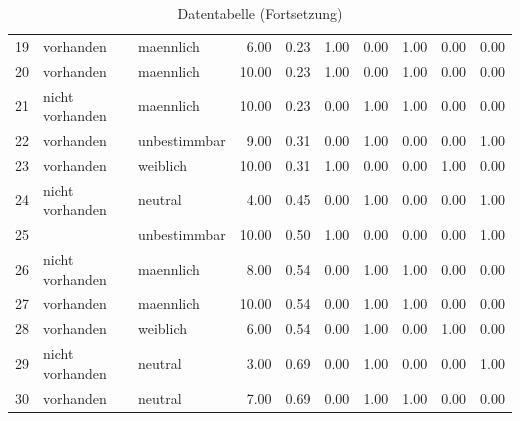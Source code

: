 \begin{table}
\begin{center}
{\begin{tabular}{rllrrrrrrr}
  19 & vorhanden & maennlich & 6.00 & 0.23 & 1.00 & 0.00 & 1.00 & 0.00 & 0.00 \\ 
  20 & vorhanden & maennlich & 10.00 & 0.23 & 1.00 & 0.00 & 1.00 & 0.00 & 0.00 \\ 
  21 & nicht vorhanden & maennlich & 10.00 & 0.23 & 0.00 & 1.00 & 1.00 & 0.00 & 0.00 \\ 
  22 & vorhanden & unbestimmbar & 9.00 & 0.31 & 0.00 & 1.00 & 0.00 & 0.00 & 1.00 \\ 
  23 & vorhanden & weiblich & 10.00 & 0.31 & 1.00 & 0.00 & 0.00 & 1.00 & 0.00 \\ 
  24 & nicht vorhanden & neutral & 4.00 & 0.45 & 0.00 & 1.00 & 0.00 & 0.00 & 1.00 \\ 
  25 &  & unbestimmbar & 10.00 & 0.50 & 1.00 & 0.00 & 0.00 & 0.00 & 1.00 \\ 
  26 & nicht vorhanden & maennlich & 8.00 & 0.54 & 0.00 & 1.00 & 1.00 & 0.00 & 0.00 \\ 
  27 & vorhanden & maennlich & 10.00 & 0.54 & 0.00 & 1.00 & 1.00 & 0.00 & 0.00 \\ 
  28 & vorhanden & weiblich & 6.00 & 0.54 & 0.00 & 1.00 & 0.00 & 1.00 & 0.00 \\ 
  29 & nicht vorhanden & neutral & 3.00 & 0.69 & 0.00 & 1.00 & 0.00 & 0.00 & 1.00 \\ 
  30 & vorhanden & neutral & 7.00 & 0.69 & 0.00 & 1.00 & 1.00 & 0.00 & 0.00 \\ 
   \hline
\end{tabular}
}
\caption{Datentabelle (Fortsetzung)}
\label{merkmale}
\end{center}
\end{table}

